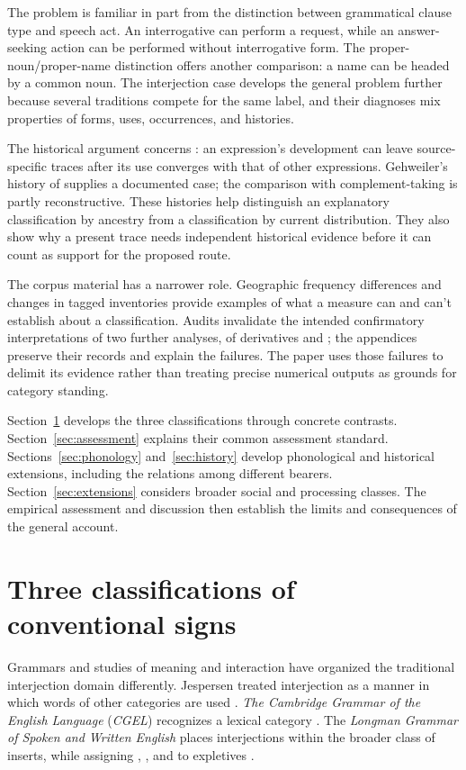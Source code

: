 \documentclass[12pt]{article}
\begin{document}
The problem is familiar in part from the distinction between grammatical
clause type and speech act. An interrogative can perform a request, while
an answer-seeking action can be performed without interrogative form. The
proper-noun/proper-name distinction offers another comparison: a name can
be headed by a common noun. The interjection case develops the general
problem further because several traditions compete for the same label,
and their diagnoses mix properties of forms, uses, occurrences, and histories.

The historical argument concerns : an expression's
development can leave source-specific traces after its use converges with
that of other expressions. Gehweiler's history of  supplies a
documented case; the comparison with complement-taking  is
partly reconstructive. These histories help distinguish an explanatory
classification by ancestry from a classification by current distribution.
They also show why a present trace needs independent historical evidence
before it can count as support for the proposed route.

The corpus material has a narrower role. Geographic frequency differences
and changes in tagged inventories provide examples of what a measure can
and can't establish about a classification. Audits invalidate the intended
confirmatory interpretations of two further analyses, of derivatives and
; the appendices preserve their records and explain the failures.
The paper uses those failures to delimit its evidence rather than treating
precise numerical outputs as grounds for category standing.

Section~\ref{sec:worked} develops the three classifications through concrete
contrasts. Section~\ref{sec:assessment} explains their common assessment
standard. Sections~\ref{sec:phonology} and~\ref{sec:history} develop phonological
and historical extensions, including the relations among different bearers.
Section~\ref{sec:extensions} considers broader social and processing classes.
The empirical assessment and discussion then establish the limits and
consequences of the general account.

\section{Three classifications of conventional signs}\label{sec:worked}

Grammars and studies of meaning and interaction have organized the traditional
interjection domain differently. Jespersen treated interjection as a manner
in which words of other categories are used \citep[90]{jespersen1924}.
\textit{The Cambridge Grammar of the English Language} (\textit{CGEL})
recognizes a lexical category \citep[22]{HuddlestonPullum2002}. The
\textit{Longman Grammar of Spoken and Written English} places interjections
within the broader class of inserts, while assigning ,
, and  to expletives \citep[1082--1083, 1094--1095]{Biber1999}.
\end{document}
